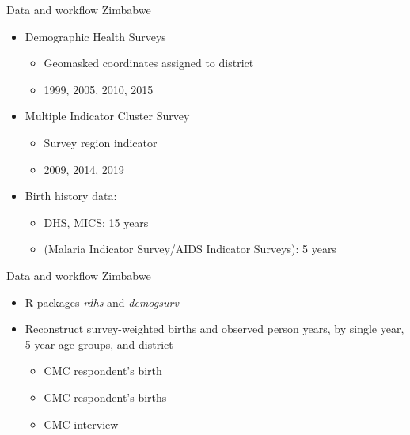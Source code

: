 \documentclass[ignorenonframetext,]{beamer}
\providecommand{\tightlist}{%
  \setlength{\itemsep}{0pt}\setlength{\parskip}{0pt}}
\begin{document}
\begin{frame}[t]{Data and workflow \textbar{} Zimbabwe}
\protect\hypertarget{data-and-workflow-zimbabwe}{}

\begin{itemize}
\tightlist
\item
  Demographic Health Surveys

  \begin{itemize}
  \tightlist
  \item
    Geomasked coordinates assigned to district
  \item
    1999, 2005, 2010, 2015
  \end{itemize}
\item
  Multiple Indicator Cluster Survey

  \begin{itemize}
  \tightlist
  \item
    Survey region indicator
  \item
    2009, 2014, 2019
  \end{itemize}
\item
  Birth history data:

  \begin{itemize}
  \tightlist
  \item
    DHS, MICS: 15 years
  \item
    (Malaria Indicator Survey/AIDS Indicator Surveys): 5 years
  \end{itemize}
\end{itemize}

\end{frame}

\begin{frame}[t]{Data and workflow \textbar{} Zimbabwe}
\protect\hypertarget{data-and-workflow-zimbabwe-1}{}

\begin{itemize}
\tightlist
\item
  R packages \emph{rdhs} and \emph{demogsurv}
\item
  Reconstruct survey-weighted births and observed person years, by
  single year, 5 year age groups, and district

  \begin{itemize}
  \tightlist
  \item
    CMC respondent's birth
  \item
    CMC respondent's births
  \item
    CMC interview
  \end{itemize}
\end{itemize}

\end{frame}
\end{document}
